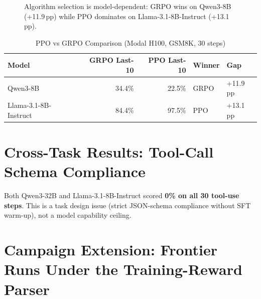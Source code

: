 \documentclass[12pt,a4paper]{report}
\theoremstyle{definition}
\begin{document}
\begin{figure}[htbp]
\centering
{}
\caption{Algorithm selection is model-dependent: GRPO wins on Qwen3-8B (+11.9\,pp) while PPO dominates on Llama-3.1-8B-Instruct (+13.1\,pp).}
\label{fig:ppo-vs-grpo}
\end{figure}


\begin{table}[htbp]
\centering
\caption{PPO vs GRPO Comparison (Modal H100, GSM8K, 30 steps)}
\label{tab:ppo-grpo}
\begin{tabular}{lrrll}
\toprule
\textbf{Model} & \textbf{GRPO Last-10} & \textbf{PPO Last-10} & \textbf{Winner} & \textbf{Gap} \\
\midrule
Qwen3-8B & 34.4\% & 22.5\% & GRPO & +11.9\,pp \\
Llama-3.1-8B-Instruct & 84.4\% & 97.5\% & PPO & +13.1\,pp \\
\bottomrule
\end{tabular}
\end{table}

\section{Cross-Task Results: Tool-Call Schema Compliance}
\label{sec:tool-use}

Both Qwen3-32B and Llama-3.1-8B-Instruct scored \textbf{0\% on all 30 tool-use steps}. This is a task design issue
(strict JSON-schema compliance without SFT warm-up), not a model capability ceiling.


\section{Campaign Extension: Frontier Runs Under the Training-Reward Parser}
\label{sec:bitter-lesson}
\end{document}
